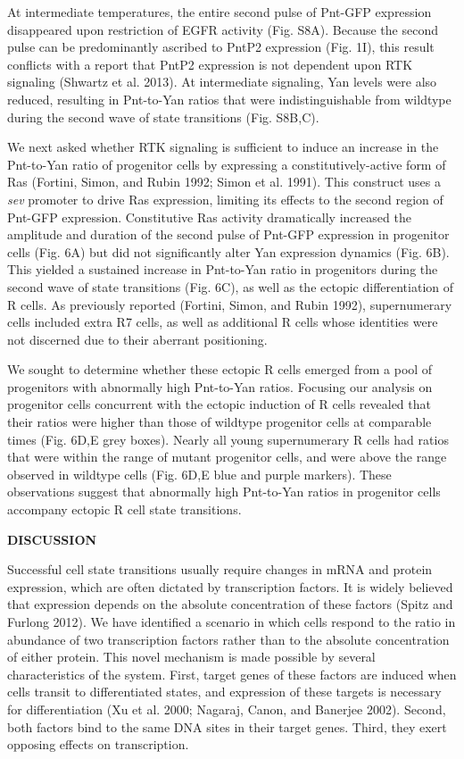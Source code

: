 At intermediate temperatures, the entire second pulse of Pnt-GFP expression disappeared upon restriction of EGFR activity (Fig. S8A). Because the second pulse can be predominantly ascribed to PntP2 expression (Fig. 1I), this result conflicts with a report that PntP2 expression is not dependent upon RTK signaling (Shwartz et al. 2013). At intermediate signaling, Yan levels were also reduced, resulting in Pnt-to-Yan ratios that were indistinguishable from wildtype during the second wave of state transitions (Fig. S8B,C).

We next asked whether RTK signaling is sufficient to induce an increase in the Pnt-to-Yan ratio of progenitor cells by expressing a constitutively-active form of Ras (Fortini, Simon, and Rubin 1992; Simon et al. 1991). This construct uses a \textit{sev} promoter to drive Ras expression, limiting its effects to the second region of Pnt-GFP expression. Constitutive Ras activity dramatically increased the amplitude and duration of the second pulse of Pnt-GFP expression in progenitor cells (Fig. 6A) but did not significantly alter Yan expression dynamics (Fig. 6B). This yielded a sustained increase in Pnt-to-Yan ratio in progenitors during the second wave of state transitions (Fig. 6C), as well as the ectopic differentiation of R cells. As previously reported (Fortini, Simon, and Rubin 1992), supernumerary cells included extra R7 cells, as well as additional R cells whose identities were not discerned due to their aberrant positioning.

We sought to determine whether these ectopic R cells emerged from a pool of progenitors with abnormally high Pnt-to-Yan ratios. Focusing our analysis on progenitor cells concurrent with the ectopic induction of R cells revealed that their ratios were higher than those of wildtype progenitor cells at comparable times (Fig. 6D,E grey boxes). Nearly all young supernumerary R cells had ratios that were within the range of mutant progenitor cells, and were above the range observed in wildtype cells (Fig. 6D,E blue and purple markers). These observations suggest that abnormally high Pnt-to-Yan ratios in progenitor cells accompany ectopic R cell state transitions.

\textbf{DISCUSSION}

Successful cell state transitions usually require changes in mRNA and protein expression, which are often dictated by transcription factors. It is widely believed that expression depends on the absolute concentration of these factors (Spitz and Furlong 2012). We have identified a scenario in which cells respond to the ratio in abundance of two transcription factors rather than to the absolute concentration of either protein. This novel mechanism is made possible by several characteristics of the system. First, target genes of these factors are induced when cells transit to differentiated states, and expression of these targets is necessary for differentiation (Xu et al. 2000; Nagaraj, Canon, and Banerjee 2002). Second, both factors bind to the same DNA sites in their target genes. Third, they exert opposing effects on transcription.

